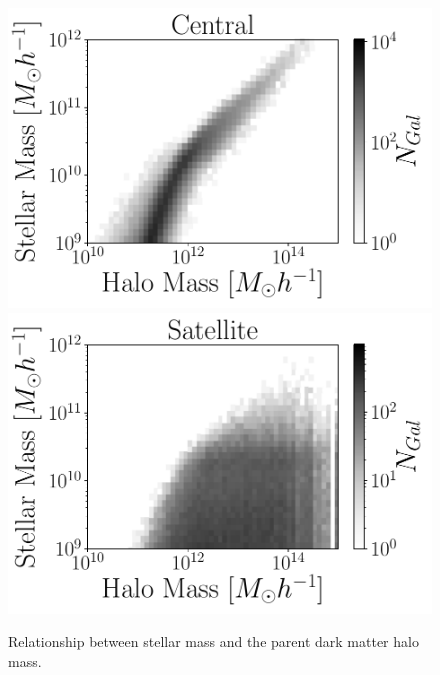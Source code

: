 \documentclass[fleqn,usenatbib]{mnras}
\begin{document}
\begin{figure}
    \centering
     \includegraphics[width=1\columnwidth]{figuras/his2_centrales.pdf}
    \includegraphics[width=1\columnwidth]{figuras/his2_satelite.pdf}
    \caption{Relationship between stellar mass and the parent dark
      matter halo mass.} 
    \label{fig:stellar_to_halo}
\end{figure}
\end{document}
